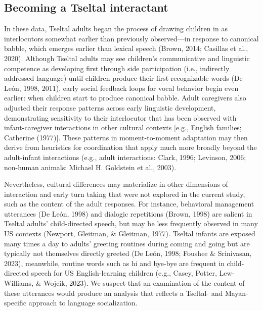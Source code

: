 \documentclass[
  man]{apa6}
\begin{document}
\hypertarget{becoming-a-tseltal-interactant}{%
\subsection{Becoming a Tseltal interactant}\label{becoming-a-tseltal-interactant}}

In these data, Tseltal adults began the process of drawing children in as interlocutors somewhat earlier than previously observed---in response to canonical babble, which emerges earlier than lexical speech (Brown, 2014; Casillas et al., 2020). Although Tseltal adults may see children's communicative and linguistic competence as developing first through side participation (i.e., indirectly addressed language) until children produce their first recognizable words (De León, 1998, 2011), early social feedback loops for vocal behavior begin even earlier: when children start to produce canonical babble. Adult caregivers also adjusted their response patterns across early linguistic development, demonstrating sensitivity to their interlocutor that has been observed with infant-caregiver interactions in other cultural contexts {[}e.g., English families; Catherine (1977){]}. These patterns in moment-to-moment adaptation may then derive from heuristics for coordination that apply much more broadly beyond the adult-infant interactions (e.g., adult interactions: Clark, 1996; Levinson, 2006; non-human animals: Michael H. Goldstein et al., 2003).

Nevertheless, cultural differences may materialize in other dimensions of interaction and early turn taking that were not explored in the current study, such as the content of the adult responses. For instance, behavioral management utterances (De León, 1998) and dialogic repetitions (Brown, 1998) are salient in Tseltal adults' child-directed speech, but may be less frequently observed in many US contexts (Newport, Gleitman, \& Gleitman, 1977). Tseltal infants are exposed many times a day to adults' greeting routines during coming and going but are typically not themselves directly greeted (De León, 1998; Foushee \& Srinivasan, 2023), meanwhile, routine words such as hi and bye-bye are frequent in child-directed speech for US English-learning children (e.g., Casey, Potter, Lew-Williams, \& Wojcik, 2023). We suspect that an examination of the content of these utterances would produce an analysis that reflects a Tseltal- and Mayan-specific approach to language socialization.
\end{document}

